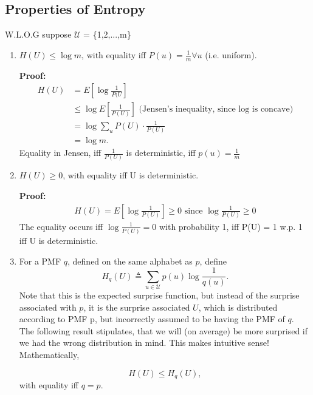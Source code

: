 \documentclass{article}
\begin{document}
\subsection{Properties of Entropy}
W.L.O.G suppose $\mathcal{U}$ = \{1,2,...,m\}
\begin{enumerate}
\item $H(U) \leq \log{m}$, with equality iff $P(u) = \frac{1}{m} \forall u$ (i.e. uniform).

\textbf{Proof:}
\begin{align}
H(U) &= E[\log\frac{1}{P(U}] \\
 &\leq \log E[\frac{1}{P(U)}] \text{ (Jensen's inequality, since log is concave)} \\
 &= \log \sum_u P(U) \cdot \frac{1}{P(U)} \\
 &= \log m. 
\end{align}
Equality in Jensen, iff $\frac{1}{P(U)}$ is deterministic, iff $p(u) = \frac{1}{m}$
\item $H(U) \geq 0$, with equality iff U is deterministic.

\textbf{Proof:}
\begin{align}
H(U) = E[\log\frac{1}{P(U)}] \geq 0 \text{ since } \log \frac{1}{P(U)}\geq 0
\end{align}
The equality occurs iff $\log \frac{1}{P(U)} = 0$ with probability 1, iff P(U) = 1 w.p. 1 iff U is deterministic.

\item For a PMF $q$, defined on the same alphabet as $p$, define
      \begin{equation} \label{eq:property3}
           H_q(U) \triangleq \sum\limits_{u \in \mathcal{U}} p(u) \log \frac{1}{q(u)}.
       \end{equation}
       Note that this is the expected surprise function, but instead of the surprise associated with $p$, it is the surprise associated $U$, which is distributed according to PMF p, but incorrectly assumed to be having the PMF of $q$. The following result stipulates, that we will (on average) be more surprised if we had the wrong distribution in mind. This makes intuitive sense! Mathematically, 

      \begin{equation} \label{eq:property3b}
           H(U) \leq H_q(U),
       \end{equation}
with equality iff $q = p$.


\end{enumerate}
\end{document}
